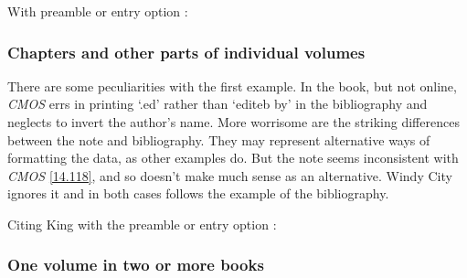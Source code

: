 \documentclass[11pt,letterpaper,oneside]{article}
\begin{document}
\begin{citebib}
\item \cite{armstrong2014}
\end{citebib}

\noindent With preamble or entry option :

\begin{citebib}
\item \cite{armstrong2014}
\end{citebib}

\subsubsection{Chapters and other parts of individual volumes}
\label{14.120}

There are some peculiarities with the first example. In the book, but
not online, \textit{CMOS} errs in printing `.ed' rather than `editeb
by' in the bibliography and neglects to invert the author's name. More
worrisome are the striking differences between the note and
bibliography. They may represent alternative ways of formatting the
data, as other examples do. But the note seems inconsistent with
\textit{CMOS} \ref{14.118}, and so doesn't make much sense as an
alternative. Windy City ignores it and in both cases follows the
example of the bibliography.

\begin{citebib}
\item \cite[180]{chen2010.3}
\item \cite[169--71]{king2014}
\end{citebib}

\noindent Citing King with the preamble or entry option
:

\begin{citebib}
\item \cite[169--71]{king2014}
\end{citebib}

\subsubsection{One volume in two or more books}
\label{14.121}

\begin{citebib}
\item \cite[351]{lach1977}
\item \cite{harley1994}
\end{citebib}
\end{document}
